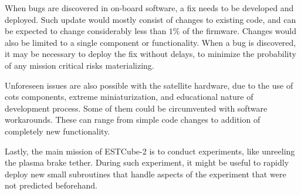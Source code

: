 When bugs are discovered in on-board software, a fix needs to be developed and deployed. Such update would mostly consist of changes to existing code, and can be expected to change considerably less than $1\%$ of the firmware. Changes would also be limited to a single component or functionality. When a bug is discovered, it may be necessary to deploy the fix without delays, to minimize the probability of any mission critical risks materializing.

Unforeseen issues are also possible with the satellite hardware, due to the use of \gls{cots} components, extreme miniaturization, and educational nature of development process. Some of them could be circumvented with software workarounds. These can range from simple code changes to addition of completely new functionality.

Lastly, the main mission of ESTCube-2 is to conduct experiments, like unreeling the plasma brake tether. During such experiment, it might be useful to rapidly deploy new small subroutines that handle aspects of the experiment that were not predicted beforehand.